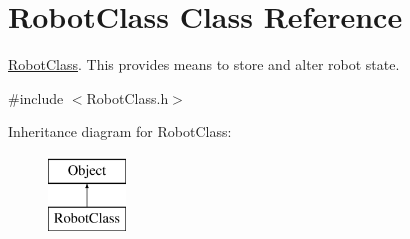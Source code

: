 \hypertarget{classRobotClass}{\section{Robot\-Class Class Reference}
\label{classRobotClass}
}


\hyperlink{classRobotClass}{Robot\-Class}. This provides means to store and alter robot state.  




{\ttfamily \#include $<$Robot\-Class.\-h$>$}

Inheritance diagram for Robot\-Class\-:\begin{figure}[H]
\begin{center}
\leavevmode
\includegraphics[height=2.000000cm]{classRobotClass}
\end{center}
\end{figure}
